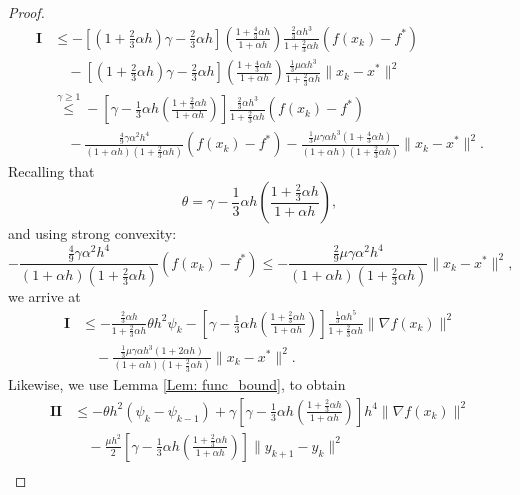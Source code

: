 \documentclass[pdflatex,sn-mathphys-num]{sn-jnl}
\theoremstyle{thmstyleone}
\theoremstyle{thmstyletwo}
\theoremstyle{thmstylethree}
\begin{document}
\begin{appendices}
\begin{proof}
\begin{align*}
\mathbf{I}
&\le - \left[ \left( 1+\frac{2}{3}\alpha h \right) \gamma - \frac{2}{3}\alpha h \right]\left( \frac{ 1 + \frac{4}{3}\alpha h }{1+\alpha h} \right) \frac{ \frac{2}{3}\alpha h^3 }{1+\frac{2}{3}\alpha h} (f(x_k)-f^*) \\
&\quad - \left[ \left( 1+\frac{2}{3}\alpha h \right) \gamma - \frac{2}{3}\alpha h \right]\left( \frac{ 1 + \frac{4}{3}\alpha h }{1+\alpha h} \right) \frac{ \frac{1}{3}\mu\alpha h^3 }{1+\frac{2}{3}\alpha h}\| x_k - x^* \|^2 \\
&\stackrel{\gamma\ge 1}{\le} 
  - \left[ \gamma  - \frac{1}{3}\alpha h\left( \frac{1 + \frac{2}{3}\alpha h}{1+\alpha h} \right) \right] \frac{ \frac{2}{3}\alpha h^3 }{1+\frac{2}{3}\alpha h}(f(x_k)-f^*) \\
&\quad - \frac{ \frac{4}{9}\gamma\alpha^2 h^4 }{(1+\alpha h)\left(1+\frac{2}{3}\alpha h\right)}(f(x_k)-f^*)
  - \frac{ \frac{1}{3}\mu\gamma \alpha h^3 \left( 1 + \frac{4}{3}\alpha h \right) }{(1+\alpha h)\left(1+\frac{2}{3}\alpha h\right)} \| x_k - x^* \|^2.   
\end{align*}
Recalling that
$$ \theta = \gamma  - \frac{1}{3}\alpha h\left( \frac{1 + \frac{2}{3}\alpha h}{1+\alpha h} \right), $$
and using strong convexity:
$$ - \frac{ \frac{4}{9}\gamma\alpha^2 h^4 }{(1+\alpha h)\left(1+\frac{2}{3}\alpha h\right)}(f(x_k)-f^*) \le - \frac{ \frac{2}{9}\mu\gamma\alpha^2 h^4 }{(1+\alpha h)\left(1+\frac{2}{3}\alpha h\right)}\| x_k - x^* \|^2,  $$
we arrive at
\begin{align*}
\mathbf{I}
&\le -\frac{ \frac{2}{3}\alpha h }{1+\frac{2}{3}\alpha h}\theta h^2 \psi_k
   - \left[ \gamma  - \frac{1}{3}\alpha h\left( \frac{1 + \frac{2}{3}\alpha h}{1+\alpha h} \right) \right] \frac{ \frac{1}{3}\alpha h^5 }{1+\frac{2}{3}\alpha h}\| \nabla f(x_k) \|^2 \\
&\quad - \frac{ \frac{1}{3}\mu\gamma \alpha h^3 ( 1 + 2\alpha h ) }{(1+\alpha h)\left(1+\frac{2}{3}\alpha h\right)} \| x_k - x^* \|^2.  
\end{align*}
Likewise, we use Lemma \ref{Lem: func_bound}, to obtain
\begin{align*}
\mathbf{II}
&\le - \theta h^2 (\psi_k - \psi_{k-1})
     + \gamma \left[ \gamma  - \frac{1}{3}\alpha h\left( \frac{1 + \frac{2}{3}\alpha h}{1+\alpha h} \right) \right] h^4 \| \nabla f(x_k) \|^2\\
&\quad - \frac{\mu h^2}{2}\left[ \gamma  - \frac{1}{3}\alpha h\left( \frac{1 + \frac{2}{3}\alpha h}{1+\alpha h} \right) \right] \| y_{k+1} - y_k \|^2\\

\end{align*}
\end{proof}
\end{appendices}
\end{document}
